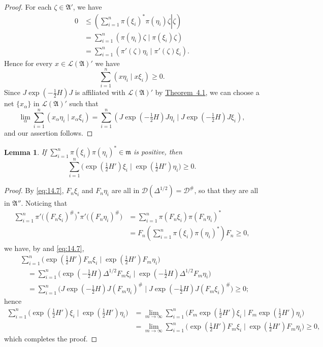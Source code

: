 \documentclass[12pt,b5paper,twoside]{article}
\theoremstyle{takesaki}
\newtheorem{lemma}{Lemma}[section]
\numberwithin{equation}{section}
\begin{document}
\begin{proof}
For each $\zeta\in\mathfrak A'$, we have
\begin{align*}
  0
  &\leq
  \left(\left.\sum_{i=1}^{n}\pi(\xi_i)^*\pi(\eta_i)\zeta
  \right|\zeta\right)\\
  &=\sum_{i=1}^{n}(\pi(\eta_i)\zeta\mid\pi(\xi_i)\zeta)\\
  &=\sum_{i=1}^{n}(\pi'(\zeta)\eta_i\mid\pi'(\zeta)\xi_i).
\end{align*}
Hence for every $x\in\mathcal L(\mathfrak A)'$ we have
\[
  \sum_{i=1}^{n}(x\eta_i\mid x\xi_i)\geq0.
\]
Since $J\exp(-\tfrac12H)J$ is affiliated with
$\mathcal L(\mathfrak A)'$ by \hyperref[thm:4.1]{Theorem~4.1}, we can
choose a net $\{x_\alpha\}$ in $\mathcal L(\mathfrak A)'$ such that
\[
  \lim_\alpha\sum_{i=1}^{n}(x_\alpha\eta_i\mid x_\alpha\xi_i)
   =\sum_{i=1}^{n}
    (J\exp(-\tfrac12H)J\eta_i
      \mid J\exp(-\tfrac12H)J\xi_i),
\]
and our assertion follows.
\end{proof}

\begin{lemma}\label{lem:14.3}
If
$\sum_{i=1}^{n}\pi(\xi_i)\pi(\eta_i)^*\in\mathfrak m$ is positive,
then
\begin{equation}
  \sum_{i=1}^{n}
   \bigl(\exp(\tfrac12H')\xi_i
      \mid\exp(\tfrac12H')\eta_i\bigr)\geq0.
  \tag{14.11}\label{eq:14.11}
\end{equation}
\end{lemma}

\begin{proof}
By \eqref{eq:14.7}, $F_n\xi_i$ and $F_n\eta_i$ are all in
$\mathcal D(\Delta^{1/2})=\mathcal D^{\#}$, so that they are all in
$\mathfrak A''$.  Noticing that
\begin{align*}
 \sum_{i=1}^{n}
   \pi'\bigl((F_n\xi_i)^{\#}\bigr)^*
   \pi'\bigl((F_n\eta_i)^{\#}\bigr)
 &=\sum_{i=1}^{n}\pi(F_n\xi_i)\pi(F_n\eta_i)^*\\
 &=F_n\left(\sum_{i=1}^{n}\pi(\xi_i)\pi(\eta_i)^*\right)F_n\geq0,
\end{align*}
we have, by  and \eqref{eq:14.7},
\begin{align*}
 &\sum_{i=1}^{n}
  \bigl(\exp(\tfrac12H')F_m\xi_i
      \mid\exp(\tfrac12H')F_m\eta_i\bigr)\\
 &\quad=\sum_{i=1}^{n}
  \bigl(\exp(-\tfrac12H)\Delta^{1/2}F_m\xi_i
      \mid\exp(-\tfrac12H)\Delta^{1/2}F_m\eta_i\bigr)\\
 &\quad=\sum_{i=1}^{n}
  \bigl(J\exp(-\tfrac12H)J(F_m\eta_i)^{\#}
      \mid J\exp(-\tfrac12H)J(F_m\xi_i)^{\#}\bigr)\geq0;
\end{align*}
hence
\begin{align*}
 \sum_{i=1}^{n}
  \bigl(\exp(\tfrac12H')\xi_i
       \mid\exp(\tfrac12H')\eta_i\bigr)
 &=\lim_{m\to\infty}\sum_{i=1}^{n}
   \bigl(F_m\exp(\tfrac12H')\xi_i
       \mid F_m\exp(\tfrac12H')\eta_i\bigr)\\
 &=\lim_{m\to\infty}\sum_{i=1}^{n}
   \bigl(\exp(\tfrac12H')F_m\xi_i
       \mid\exp(\tfrac12H')F_m\eta_i\bigr)\geq0,
\end{align*}
which completes the proof.
\end{proof}
\end{document}
